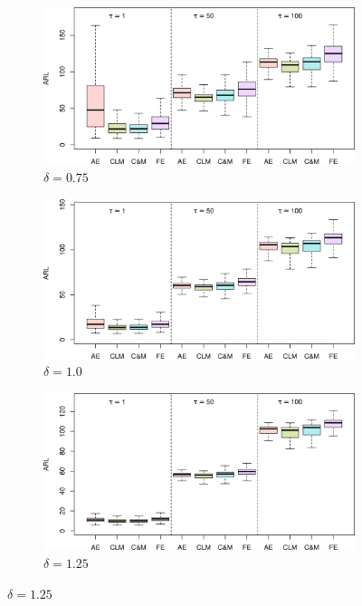 \begin{figure}
\begin{subfigure}{0.49\textwidth}
\end{subfigure}
\begin{subfigure}{0.49\textwidth}
  \centering
  \caption{$ \delta = 0.75$}
  \label{fig:lambda=0.125/theta=4.0/delta=0.75}
  \includegraphics[width=\textwidth]{img/sims/theta=4.0_signedEWMA(l = 0.125, upw = true, L = 1.0)/delta=0.75.png}
\end{subfigure}
\begin{subfigure}{0.49\textwidth}
  \centering
  \caption{$ \delta = 1.0$}
  \label{fig:lambda=0.125/theta=4.0/delta=1.0}
  \includegraphics[width=\textwidth]{img/sims/theta=4.0_signedEWMA(l = 0.125, upw = true, L = 1.0)/delta=1.00.png}
\end{subfigure}
\begin{subfigure}{0.49\textwidth}
  \centering
  \caption{$ \delta = 1.25$}
  \label{fig:lambda=0.125/theta=4.0/delta=1.25}
  \includegraphics[width=\textwidth]{img/sims/theta=4.0_signedEWMA(l = 0.125, upw = true, L = 1.0)/delta=1.25.png}

\end{subfigure}
\end{figure}

